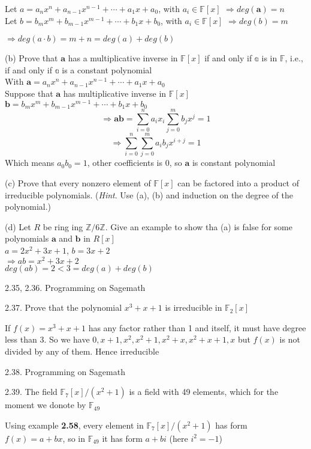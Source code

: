     Let $a=a_n x^n + a_{n-1} x^{n-1} + \cdots + a_1 x + a_0$, with $a_i \in \mathbb{F}[x]$ $\Rightarrow deg(\mathbf{a}) = n$ \\ Let $b = b_m x^m + b_{m-1} x^{m-1} + \cdots + b_1 x + b_0$, with $a_i \in \mathbb{F}[x]$ $\Rightarrow deg(b) = m$ 
    
    $\Rightarrow deg(a \cdot b) = m+n = deg(a) + deg(b)$

(b) Prove that $\mathbf{a}$ has a multiplicative inverse in $\mathbb{F}[x]$ if and only if $\mathbb{a}$ is in $\mathbb{F}$, i.e., if and only if $\mathbb{a}$ is a constant polynomial \\ With $\mathbf{a} = a_n x^n + a_{n-1} x^{n-1} + \cdots + a_1 x + a_0$ \\ Suppose that $\mathbf{a}$ has multiplicative inverse in $\mathbb{F}[x]$ $\mathbf{b}=b_m x^m + b_{m-1} x^{m-1} + \cdots + b_1 x + b_0$ \[\Rightarrow \mathbf{ab} = \sum_{i=0}^n a_i x_i \sum_{j=0}^m b_j x^j = 1\] \[\Rightarrow \sum_{i=0}^n \sum_{j=0}^m a_i b_j x^{i+j} = 1\] Which means $a_0 b_0 = 1$, other coefficients is 0, so $\mathbf{a}$ is constant polynomial

(c) Prove that every nonzero element of $\mathbb{F}[x]$ can be factored into a product of irreducible polynomials. (\textit{Hint}. Use (a), (b) and induction on the degree of the polynomial.)

(d) Let $R$ be ring ing $\mathbb{Z}/6\mathbb{Z}$. Give an example to show tha (a) is false for some polynomials $\mathbf{a}$ and $\mathbf{b}$ in $R[x]$ \\ $a=2x^2 + 3x + 1$, $b=3x+2$ \\ $\Rightarrow ab = x^2 + 3x + 2$ \\ $deg(ab) = 2 < 3 = deg(a) + deg(b)$


2.35, 2.36. Programming on Sagemath

2.37. Prove that the polynomial $x^3+x+1$ is irreducible in $\mathbb{F}_2[x]$

If $f(x) = x^3+x+1$ has any factor rather than 1 and itself, it must have degree less than 3. So we have $0, x+1, x^2, x^2+1, x^2+x, x^2+x+1, x$ but $f(x)$ is not divided by any of them. Hence irreducible


2.38. Programming on Sagemath

2.39. The field $\mathbb{F}_7[x]/(x^2+1)$ is a field with 49 elements, which for the moment we donote by $\mathbb{F}_{49}$

Using example \textbf{2.58}, every element in $\mathbb{F}_7[x]/(x^2+1)$ has form $f(x)=a+bx$, so in $\mathbb{F}_{49}$ it has form $a+bi$ (here $i^2=-1$)

